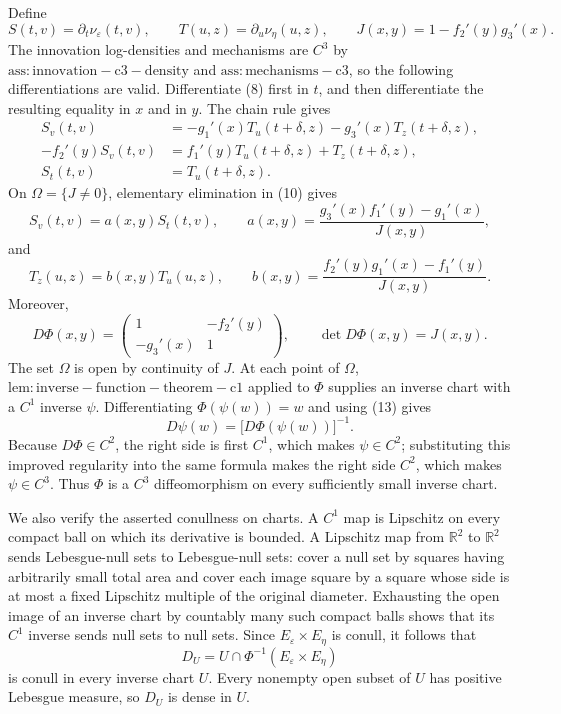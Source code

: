 Define
\[
 S(t,v)=\partial_t\nu_\varepsilon(t,v),
 \qquad T(u,z)=\partial_u\nu_\eta(u,z),
 \qquad J(x,y)=1-f_2'(y)g_3'(x).
\tag{9}
\]
The innovation log-densities and mechanisms are \(C^3\) by \(\mathrm{ass:innovation-c3-density}\) and \(\mathrm{ass:mechanisms-c3}\), so the following differentiations are valid.  Differentiate (8) first in \(t\), and then differentiate the resulting equality in \(x\) and in \(y\).  The chain rule gives
\[
 \begin{aligned}
 S_v(t,v)&=-g_1'(x)T_u(t+\delta,z)-g_3'(x)T_z(t+\delta,z),\\
 -f_2'(y)S_v(t,v)&=f_1'(y)T_u(t+\delta,z)+T_z(t+\delta,z),\\
 S_t(t,v)&=T_u(t+\delta,z).
 \end{aligned}
\tag{10}
\]
On \(\Omega=\{J\ne0\}\), elementary elimination in (10) gives
\[
 S_v(t,v)=a(x,y)S_t(t,v),
 \qquad
 a(x,y)=\frac{g_3'(x)f_1'(y)-g_1'(x)}{J(x,y)},
\tag{11}
\]
and
\[
 T_z(u,z)=b(x,y)T_u(u,z),
 \qquad
 b(x,y)=\frac{f_2'(y)g_1'(x)-f_1'(y)}{J(x,y)}.
\tag{12}
\]
Moreover,
\[
 D\Phi(x,y)=
 \begin{pmatrix}1&-f_2'(y)\\-g_3'(x)&1\end{pmatrix},
 \qquad \det D\Phi(x,y)=J(x,y).
\tag{13}
\]
The set \(\Omega\) is open by continuity of \(J\).  At each point of \(\Omega\), \(\mathrm{lem:inverse-function-theorem-c1}\) applied to \(\Phi\) supplies an inverse chart with a \(C^1\) inverse \(\psi\).  Differentiating \(\Phi(\psi(w))=w\) and using (13) gives
\[
 D\psi(w)=\bigl[D\Phi(\psi(w))\bigr]^{-1}.
\]
Because \(D\Phi\in C^2\), the right side is first \(C^1\), which makes \(\psi\in C^2\); substituting this improved regularity into the same formula makes the right side \(C^2\), which makes \(\psi\in C^3\).  Thus \(\Phi\) is a \(C^3\) diffeomorphism on every sufficiently small inverse chart.

We also verify the asserted conullness on charts.  A \(C^1\) map is Lipschitz on every compact ball on which its derivative is bounded.  A Lipschitz map from \(\mathbb R^2\) to \(\mathbb R^2\) sends Lebesgue-null sets to Lebesgue-null sets: cover a null set by squares having arbitrarily small total area and cover each image square by a square whose side is at most a fixed Lipschitz multiple of the original diameter.  Exhausting the open image of an inverse chart by countably many such compact balls shows that its \(C^1\) inverse sends null sets to null sets.  Since \(E_\varepsilon\times E_\eta\) is conull, it follows that
\[
 D_U=U\cap\Phi^{-1}(E_\varepsilon\times E_\eta)
\]
is conull in every inverse chart \(U\).  Every nonempty open subset of \(U\) has positive Lebesgue measure, so \(D_U\) is dense in \(U\).

